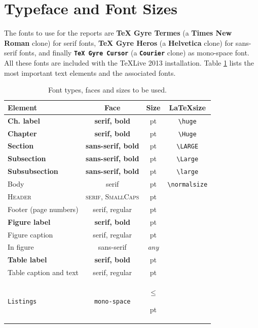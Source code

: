 \documentclass{cslthse-msc}
\makeatletter
\newcommand\thefontsize[1]{{#1 \f@size pt\par}}
\makeatother
\begin{document}
\section{Typeface and Font Sizes}
The fonts to use for the reports are \textbf{TeX Gyre Termes} (a \textbf{Times New Roman} clone) for serif fonts, \textsf{\textbf{TeX Gyre Heros}} (a \textsf{\textbf{Helvetica}} clone) for sans-serif fonts, and finally \texttt{\textbf{TeX Gyre Cursor}} (a \texttt{\textbf{Courier}} clone) as mono-space font. All these fonts are included with the TeXLive 2013 installation. Table \ref{tab:fonts} lists the most important text elements and the associated fonts.
\begin{table}[!hbt]
\caption{Font types, faces and sizes to be used.}\label{tab:fonts}

 \begin{tabular}{ l c c c}
\hline 
\textbf{Element} & \textbf{Face} & \textbf{Size}  & \textbf{\LaTeX size}  \\ 
\hline 
{\huge \textbf{Ch. label}} & {\huge \textbf{serif, bold}} & \thefontsize\huge & \verb+\huge+ \\ 
{\Huge \textbf{Chapter}} & {\Huge \textbf{serif, bold}} & \thefontsize\Huge & \verb+\Huge+ \\ 
{\LARGE \textsf{\textbf{Section}}} & {\Large \textsf{\textbf{sans-serif, bold}}} & \thefontsize\LARGE &  \verb+\LARGE+  \\ 
{\Large \textsf{\textbf{Subsection}}} & {\Large \textsf{\textbf{sans-serif, bold}}} & \thefontsize\Large & \verb+\Large+ \\ 
{\large \textsf{\textbf{Subsubsection}}} & {\Large \textsf{\textbf{sans-serif, bold}}} & \thefontsize\large &  \verb+\large+ \\ 
Body & serif & \thefontsize\normalsize & {\footnotesize \verb+\normalsize+} \\
{\footnotesize \textsc{Header}} & {\footnotesize \textsc{serif, SmallCaps}} & \thefontsize\footnotesize &  \\
Footer (page numbers) & serif, regular & \thefontsize\normalsize &  \\
\hline
\textbf{Figure label} & \textbf{serif, bold} & \thefontsize\normalsize & \\
Figure caption & serif, regular & \thefontsize\normalsize & \\
\textsf{In figure} & \textsf{sans-serif} & \textit{any} & \\
\textbf{Table label} & \textbf{serif, bold} & \thefontsize\normalsize & \\
Table caption and text & serif, regular & \thefontsize\normalsize & \\
\texttt{Listings} & \texttt{mono-space} & $\le$ \thefontsize\normalsize & \\
\hline 
\end{tabular} 
\end{table}
\end{document}
